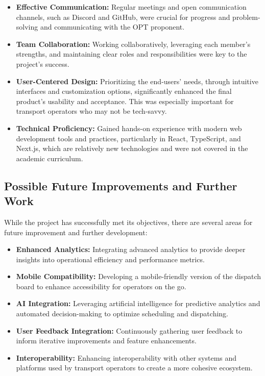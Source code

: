 \documentclass[10pt]{article}
\begin{document}
         \begin{itemize}
             \item \textbf{Effective Communication:} Regular meetings and open communication channels, such as Discord and GitHub, were crucial for progress and problem-solving and communicating with the OPT proponent.
             \item \textbf{Team Collaboration:} Working collaboratively, leveraging each member's strengths, and maintaining clear roles and responsibilities were key to the project's success.
             \item \textbf{User-Centered Design:} Prioritizing the end-users' needs, through intuitive interfaces and customization options, significantly enhanced the final product's usability and acceptance. This was especially important for transport operators who may not be tech-savvy.
             \item \textbf{Technical Proficiency:} Gained hands-on experience with modern web development tools and practices, particularly in React, TypeScript, and Next.js, which are relatively new technologies and were not covered in the academic curriculum.
         \end{itemize}
         

         \subsection{Possible Future Improvements and Further Work}

         While the project has successfully met its objectives, there are several areas for future improvement and further development:
         
         \begin{itemize}
             \item \textbf{Enhanced Analytics:} Integrating advanced analytics to provide deeper insights into operational efficiency and performance metrics.
             \item \textbf{Mobile Compatibility:} Developing a mobile-friendly version of the dispatch board to enhance accessibility for operators on the go.
             \item \textbf{AI Integration:} Leveraging artificial intelligence for predictive analytics and automated decision-making to optimize scheduling and dispatching.
             \item \textbf{User Feedback Integration:} Continuously gathering user feedback to inform iterative improvements and feature enhancements.
             \item \textbf{Interoperability:} Enhancing interoperability with other systems and platforms used by transport operators to create a more cohesive ecosystem.
         \end{itemize}
         
\end{document}
